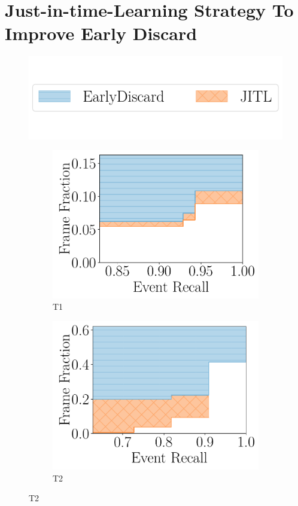 \section{Just-in-time-Learning Strategy To Improve Early Discard}
\label{sec:jitl}

\begin{figure}
    \centering
    \includegraphics[trim={0 1.8cm 0 0},clip,width=0.7\linewidth]{FIGS/fig-jitl-legend.pdf}\\
    \vspace{.5in}
    \begin{subfigure}[b]{.48\linewidth}
    \centering
    \includegraphics[width=\linewidth]{FIGS/fig-jitl-okutama-eventrecall-step.pdf}
    \caption{T1}
    \end{subfigure}
    \begin{subfigure}[b]{.48\linewidth}
    \centering
    \includegraphics[width=\linewidth]{FIGS/fig-jitl-stanford-eventrecall-step.pdf}
    \caption{T2}
    \end{subfigure}


\end{figure}
